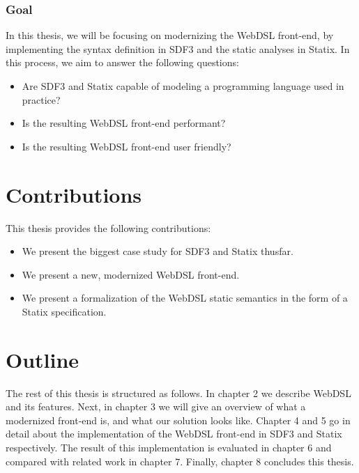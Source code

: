   \subsubsection{Goal}
  In this thesis, we will be focusing on modernizing the WebDSL front-end, by implementing the syntax definition in SDF3 and the static analyses in Statix. In this process, we aim to answer the following questions:
  
  \begin{itemize}
    \item Are SDF3 and Statix capable of modeling a programming language used in practice?
    \item Is the resulting WebDSL front-end performant?
    \item Is the resulting WebDSL front-end user friendly?
  \end{itemize}

  \section{Contributions}
    This thesis provides the following contributions:

    \begin{itemize}
      \item We present the biggest case study for SDF3 and Statix thusfar.
      \item We present a new, modernized WebDSL front-end.
      \item We present a formalization of the WebDSL static semantics in the form of a Statix specification.
    \end{itemize}

  \section{Outline}
    The rest of this thesis is structured as follows. In chapter 2 we describe WebDSL and its features. Next, in chapter 3 we will give an overview of what a modernized front-end is, and what our solution looks like. Chapter 4 and 5 go in detail about the implementation of the WebDSL front-end in SDF3 and Statix respectively. The result of this implementation is evaluated in chapter 6 and compared with related work in chapter 7. Finally, chapter 8 concludes this thesis.
